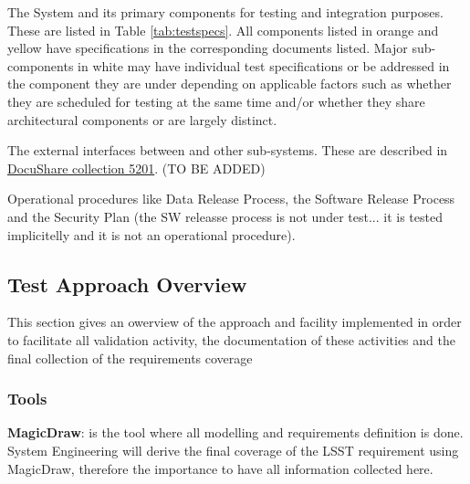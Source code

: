 \begin{itemize_single}

\item The \product{} System and its primary components for testing and integration purposes. These are listed in Table \ref{tab:testspecs}. All components listed in orange and yellow have specifications in the corresponding documents listed. Major sub-components in white may have individual test specifications or be addressed in the component they are under depending on applicable factors such as whether they are scheduled for testing at the same time and/or whether they share architectural components or are largely distinct.

\item The external interfaces between \product{} and other sub-systems. These are described in \href{https://ls.st/Collection-5201}{DocuShare collection 5201}. (TO BE ADDED)


\item Operational procedures like Data Release Process, the Software Release Process and the Security Plan (the SW releasse process is not under test... it is tested implicitelly and it is not an operational procedure).

\end{itemize_single}

\subsection{Test Approach Overview}\label{sect:tsform}

This section gives an owerview of the approach and facility implemented in order to facilitate all validation activity, the documentation of these activities and the final collection of the requirements coverage

\subsubsection{Tools}

{\bf MagicDraw}: is the tool where all modelling and requirements definition is done. System Engineering will derive the final coverage of the LSST requirement using MagicDraw, therefore the importance to have all information collected here.

